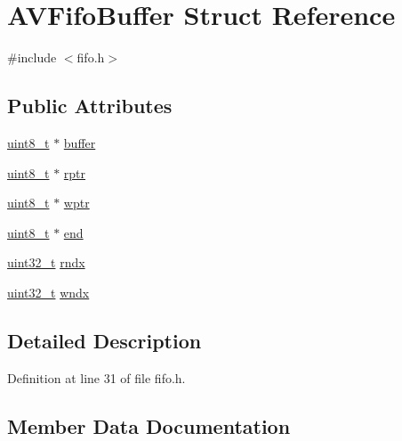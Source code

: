 \hypertarget{struct_a_v_fifo_buffer}{}\section{A\+V\+Fifo\+Buffer Struct Reference}
\label{struct_a_v_fifo_buffer}


{\ttfamily \#include $<$fifo.\+h$>$}

\subsection*{Public Attributes}
\begin{DoxyCompactItemize}
\item 
\hyperlink{lib-src_2ffmpeg_2win32_2stdint_8h_a9a941819355e6f658991890ff66b4b0e}{uint8\+\_\+t} $\ast$ \hyperlink{struct_a_v_fifo_buffer_a7ca29002daed8cd1bf486019f3a64fb1}{buffer}
\item 
\hyperlink{lib-src_2ffmpeg_2win32_2stdint_8h_a9a941819355e6f658991890ff66b4b0e}{uint8\+\_\+t} $\ast$ \hyperlink{struct_a_v_fifo_buffer_a3f75cfeac9302cdaf7badcfcba1a2193}{rptr}
\item 
\hyperlink{lib-src_2ffmpeg_2win32_2stdint_8h_a9a941819355e6f658991890ff66b4b0e}{uint8\+\_\+t} $\ast$ \hyperlink{struct_a_v_fifo_buffer_a17c13f1f8557d63a3e031af1fdd80039}{wptr}
\item 
\hyperlink{lib-src_2ffmpeg_2win32_2stdint_8h_a9a941819355e6f658991890ff66b4b0e}{uint8\+\_\+t} $\ast$ \hyperlink{struct_a_v_fifo_buffer_ad33d3db46bc5644805e2c8df0adedfb4}{end}
\item 
\hyperlink{lib-src_2ffmpeg_2win32_2stdint_8h_a6eb1e68cc391dd753bc8ce896dbb8315}{uint32\+\_\+t} \hyperlink{struct_a_v_fifo_buffer_aa45e40b2e1d183fe73df52b91605034d}{rndx}
\item 
\hyperlink{lib-src_2ffmpeg_2win32_2stdint_8h_a6eb1e68cc391dd753bc8ce896dbb8315}{uint32\+\_\+t} \hyperlink{struct_a_v_fifo_buffer_ac2c3c492ec54ed30f1eb3ec8095f557c}{wndx}
\end{DoxyCompactItemize}


\subsection{Detailed Description}


Definition at line 31 of file fifo.\+h.



\subsection{Member Data Documentation}
